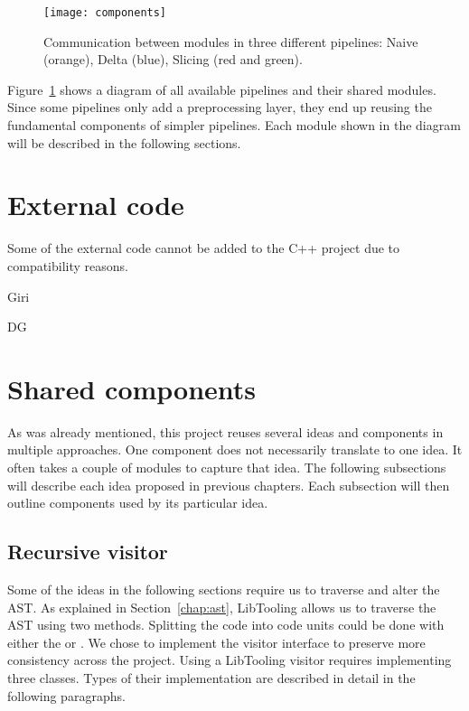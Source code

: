 \begin{figure}[h]\centering
\texttt{[image: components]}
\caption{Communication between modules in three different pipelines:
Naive (orange), Delta (blue), Slicing (red and green).}
\label{img:components}
\end{figure}

Figure~\ref{img:components} shows a diagram of all available pipelines and 
their shared modules. 
Since some pipelines only add a preprocessing layer, they end up reusing 
the fundamental components of simpler pipelines.
Each module shown in the diagram will be described in the following sections.

\section{External code}

Some of the external code cannot be added to the C++ project due to 
compatibility reasons.

Giri

DG

\section{Shared components}\label{chap:components}

As was already mentioned, this project reuses several ideas and components 
in multiple approaches. 
One component does not necessarily translate to one idea. 
It often takes a couple of modules to capture that idea. 
The following subsections will describe each idea proposed in previous 
chapters. 
Each subsection will then outline components used by its particular idea.

\subsection*{Recursive visitor}

Some of the ideas in the following sections require us to traverse and alter 
the AST.
As explained in Section~\ref{chap:ast}, LibTooling allows us to traverse 
the AST using two methods. 
Splitting the code into code units could be done with either 
the  or . 
We chose to implement the visitor interface to preserve more consistency 
across the project. 
Using a LibTooling visitor requires implementing three classes. 
Types of their implementation are described in detail in the following 
paragraphs.

